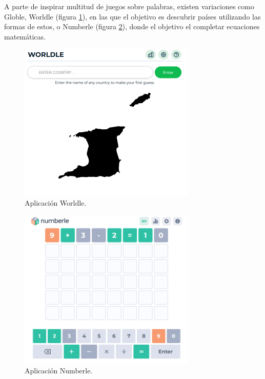 A parte de inspirar multitud de juegos sobre palabras, existen variaciones como Globle, Worldle (figura \ref{fig:worldle_app}), en las que el objetivo es descubrir países utilizando las formas de estos, o Numberle (figura \ref{fig:numberle_app}), donde el objetivo el completar ecuaciones matemáticas.

\begin{figure}
	\centering
	\includegraphics[clip=true,width=0.75\textwidth]{images/worldle.png}
	\caption{Aplicación Worldle.}
	\label{fig:worldle_app}
\end{figure}

\begin{figure}
	\centering
	\includegraphics[clip=true,width=0.75\textwidth]{images/numberle.png}
	\caption{Aplicación Numberle.}
	\label{fig:numberle_app}
\end{figure}



